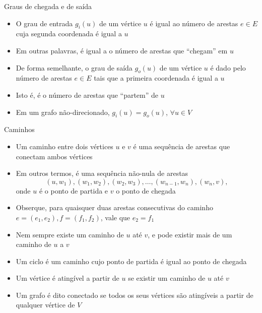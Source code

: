 



\begin{frame}[fragile]{Graus de chegada e de saída}

    \begin{itemize}
        \item O grau de entrada $g_i(u)$ de um vértice $u$ é igual ao número de arestas $e\in E$
            cuja segunda coordenada é igual a $u$

        \item Em outras palavras, é igual a o número de arestas que ``chegam'' em $u$

        \item De forma semelhante, o grau de saída $g_o(u)$ de um vértice $u$ é dado pelo número
            de arestas $e\in E$ tais que a primeira coordenada é igual a $u$

        \item Isto é, é o número de arestas que ``partem'' de $u$

        \item Em um grafo não-direcionado, $g_i(u) = g_o(u)$, $\forall u\in V$
    \end{itemize}

\end{frame}



\begin{frame}[fragile]{Caminhos}

    \begin{itemize}
        \item Um caminho entre dois vértices $u$ e $v$ é uma sequência de arestas que conectam
            ambos vértices

        \item Em outros termos, é uma sequência não-nula de arestas
        \[
            (u, w_1), (w_1, w_2), (w_2, w_3), \ldots, (w_{n-1}, w_n), (w_n, v),
        \]
        onde $u$ é o ponto de partida e $v$ o ponto de chegada

        \item Obserque, para quaisquer duas arestas consecutivas do caminho 
            $e = (e_1, e_2), f = (f_1, f_2)$, vale que $e_2 = f_1$

        \item Nem sempre existe um caminho de $u$ até $v$, e pode existir mais de um caminho de
            $u$ a $v$

        \item Um ciclo é um caminho cujo ponto de partida é igual ao ponto de chegada

        \item Um vértice é atingível a partir de $u$ se existir um caminho de $u$ até $v$

        \item Um grafo é dito conectado se todos os seus vértices são atingíveis a partir de 
            qualquer vértice de $V$
    \end{itemize}

\end{frame}



